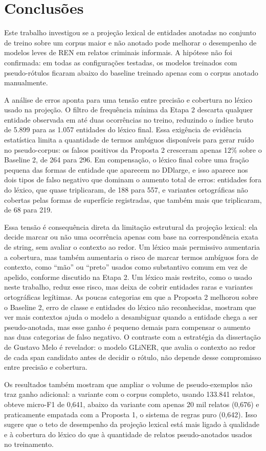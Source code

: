 \documentclass[12pt,a4paper]{article}
\begin{document}
\section{Conclusões}

Este trabalho investigou se a projeção lexical de entidades anotadas no conjunto
de treino sobre um corpus maior e não anotado pode melhorar o desempenho de
modelos leves de REN em relatos criminais informais. A hipótese não foi
confirmada: em todas as configurações testadas, os modelos treinados com
pseudo-rótulos ficaram abaixo do baseline treinado apenas com o corpus anotado
manualmente.

A análise de erros aponta para uma tensão entre precisão e cobertura no
léxico usado na projeção. O filtro de frequência mínima da Etapa 2 descarta
qualquer entidade observada em até duas ocorrências no treino, reduzindo o
índice bruto de 5.899 para as 1.057 entidades do léxico final. Essa exigência
de evidência estatística limita a quantidade de termos ambíguos disponíveis
para gerar ruído no pseudo-corpus: os falsos positivos da Proposta 2
cresceram apenas 12\% sobre o Baseline 2, de 264 para 296. Em compensação, o
léxico final cobre uma fração pequena das formas de entidade que aparecem no
DDlarge, e isso aparece nos dois tipos de falso negativo que dominam o
aumento total de erros: entidades fora do léxico, que quase triplicaram, de
188 para 557, e variantes ortográficas não cobertas pelas formas de
superfície registradas, que também mais que triplicaram, de 68 para 219.

Essa tensão é consequência direta da limitação estrutural da projeção
lexical: ela decide marcar ou não uma ocorrência apenas com base na
correspondência exata de string, sem avaliar o contexto ao redor. Um léxico
mais permissivo aumentaria a cobertura, mas também aumentaria o risco de
marcar termos ambíguos fora de contexto, como ``mão'' ou ``preto'' usados
como substantivo comum em vez de apelido, conforme discutido na Etapa 2. Um
léxico mais restrito, como o usado neste trabalho, reduz esse risco, mas
deixa de cobrir entidades raras e variantes ortográficas legítimas. As poucas
categorias em que a Proposta 2 melhorou sobre o Baseline 2, erro de classe e
entidades do léxico não reconhecidas, mostram que ver mais contextos ajuda o
modelo a desambiguar quando a entidade chega a ser pseudo-anotada, mas esse
ganho é pequeno demais para compensar o aumento nas duas categorias de falso
negativo. O contraste com a estratégia da dissertação de Gustavo Melo é
revelador: o modelo GLiNER, que avalia o contexto ao redor de cada span
candidato antes de decidir o rótulo, não depende desse compromisso entre
precisão e cobertura.

Os resultados também mostram que ampliar o volume de pseudo-exemplos não traz
ganho adicional: a variante com o corpus completo, usando 133.841 relatos,
obteve micro-F1 de 0,641, abaixo da variante com apenas 20 mil relatos
(0,676) e praticamente empatada com a Proposta 1, o sistema de regras puro
(0,642). Isso sugere que o teto de desempenho da projeção lexical está mais
ligado à qualidade e à cobertura do léxico do que à quantidade de relatos
pseudo-anotados usados no treinamento.



\end{document}

